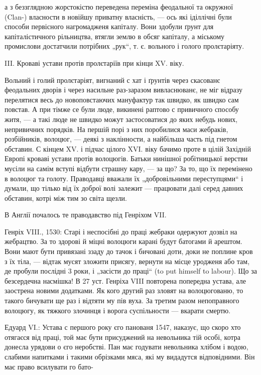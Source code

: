 а з беззглядною жорстокістю переведена переміна феодальної та окружної (Clan-) власности в новійшу
приватну власність, — ось які іділлічні були способи первісного нагромадженя капіталу. Вони здобули
ґрунт для капіталістичного рільництва, втягли землю в обсяг капіталу, а міському промислови
достатчили потрібних „рук“, т. є. вольного і голого пролєтаріяту.

III.   Кроваві устави протів пролєтаріїв при кінци XV. віку.

Вольний і голий пролєтаріят, вигнаний с хат і ґрунтів через скасованє феодальних дворів і через
насильне раз-заразом вивласнюванє, не міг відразу перелятися весь до
новоповстаючих мануфактур так швидко, як швидко сам повстав. А при тімже се були люде, викинені
раптово с привичного способу житя, — а такі люде не швидко можут
застосоватися до яких небудь нових, непривичних порядків. На першій порі з них поробилися маси
жебраків, розбійників, волоцюг, — деякі з наклінности, а найбільша часть під гнетом обставин. С
кінцем XV. і підчас цілого XVI. віку бачимо проте в цілій Західній Европі кроваві устави протів
волоцюгів. Батьки нинішної робітницької верстви мусіли на самім вступі відбути страшну кару, — за
що? За то, що їх перемінено в волоцюг та голоту. Праводавці вважали їх „добровільними переступцями“
і думали, що тілько від їх доброї волі залежит — працювати далі серед давних обставин, котрі між тим
зо світа щезли.

В Англії почалось те праводавство під Генріхом VII.

Генріх VIII., 1530: Старі і неспосібні до праці жебраки одержуют дозвіл на жебрацтво. За то здорові
й міцні волоцюги карані будут батогами й арештом. Вони мают бути привязані ззаду до тачок і бичовані
доти, доки не поплине кров з їх тіла, — відтак мусят зложити присягу, вернути на місце уродженя або
там, де пробули послідні 3 роки, і „засісти до праці“ (to put himself to labour). Що за безсердечна
насмішка! В 27 уст. Генріха VIII повторена попередна устава, але заострена новими додатками. Як кого
другий раз зловят на волоцюгованю, то такого бичувати ще раз і відтяти му пів вуха. За третим разом
непоправного волоцюгу, як тяжкого злочинця і ворога суспільности —
вкарати смертю.

Едуард VI.: Устава с першого року єго панованя 1547, наказує, що скоро хто отягаєся від праці, той
має бути присуджений на невольника тій особі, котра донесла урядови
о єго неробстві. Пан має годувати невольника хлібом і водою, слабими напитками і такими обрізками
мяса, які му видадутся відповідними. Він має право всилувати го бато-
